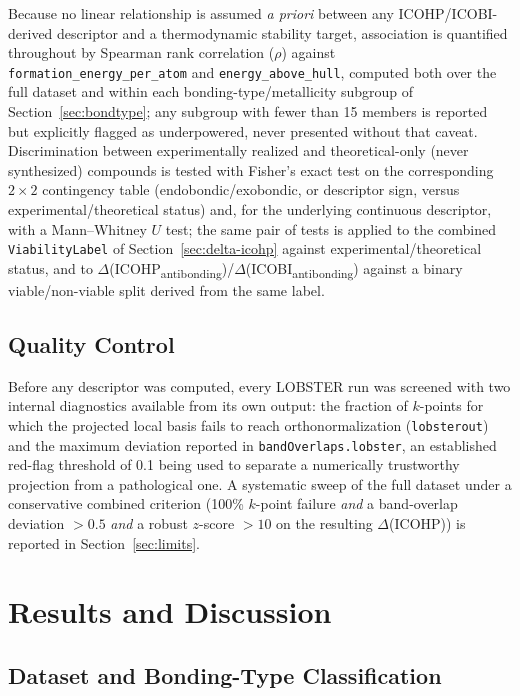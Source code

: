 \documentclass[journal=jpccck,manuscript=article]{achemso}
\begin{document}
Because no linear relationship is assumed \emph{a priori} between any
ICOHP/ICOBI-derived descriptor and a thermodynamic stability target,
association is quantified throughout by Spearman rank correlation ($\rho$)
against \texttt{formation\_energy\_per\_atom} and
\texttt{energy\_above\_hull}, computed both over the full dataset and within
each bonding-type/metallicity subgroup of Section~\ref{sec:bondtype}; any
subgroup with fewer than 15 members is reported but explicitly flagged as
underpowered, never presented without that caveat. Discrimination between
experimentally realized and theoretical-only (never synthesized) compounds
is tested with Fisher's exact test on the corresponding $2\times2$
contingency table (endobondic/exobondic, or descriptor sign, versus
experimental/theoretical status) and, for the underlying continuous
descriptor, with a Mann--Whitney $U$ test; the same pair of tests is applied
to the combined \texttt{ViabilityLabel} of Section~\ref{sec:delta-icohp}
against experimental/theoretical status, and to
$\Delta$(ICOHP\textsubscript{antibonding})/$\Delta$(ICOBI\textsubscript{antibonding})
against a binary viable/non-viable split derived from the same label.

\subsection{Quality Control}
\label{sec:validation-methods}

Before any descriptor was computed, every LOBSTER run was screened with two
internal diagnostics available from its own output: the fraction of
$k$-points for which the projected local basis fails to reach
orthonormalization (\texttt{lobsterout}) and the maximum deviation reported
in \texttt{bandOverlaps.lobster}, an established red-flag threshold of 0.1
being used to separate a numerically trustworthy projection from a
pathological one. A systematic sweep of the full dataset under a
conservative combined criterion (100\% $k$-point failure \emph{and} a
band-overlap deviation $>0.5$ \emph{and} a robust $z$-score $>10$ on the
resulting $\Delta$(ICOHP)) is reported in Section~\ref{sec:limits}.

\section{Results and Discussion}
\label{sec:results}
\label{sec:discussion}

\subsection{Dataset and Bonding-Type Classification}
\label{sec:res-dataset}
\end{document}

